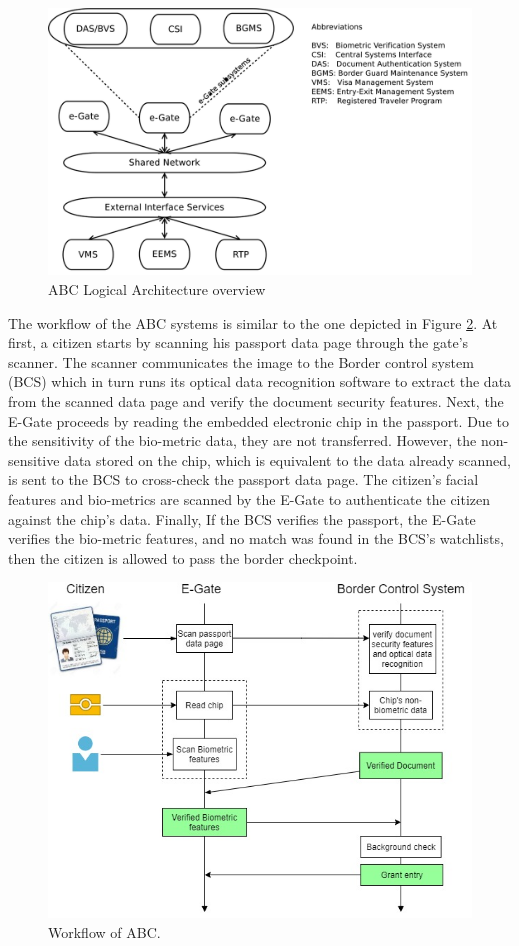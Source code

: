 \begin{figure}[H]
	\centering
	\includegraphics[scale=0.35]{Images/E-Gate-Architecture.png}
	\caption{ABC Logical Architecture overview \cite{labati2016biometric}}
	\label{E-Gate-Architecture}
\end{figure}

\par
The workflow of the ABC systems is similar to the one depicted in Figure \ref{workflow}. At first, a citizen starts by scanning his passport data page through the gate's scanner. The scanner communicates the image to the Border control system (BCS) which in turn runs its optical data recognition software to extract the data from the scanned data page and verify the document security features. Next, the E-Gate proceeds by reading the embedded electronic chip in the passport. Due to the sensitivity of the bio-metric data, they are not transferred. However, the non-sensitive data stored on the chip, which is equivalent to the data already scanned, is sent to the BCS to cross-check the passport data page. The citizen's facial features and bio-metrics are scanned by the E-Gate to authenticate the citizen against the chip's data. Finally, If the BCS verifies the passport, the E-Gate verifies the bio-metric features, and no match was found in the BCS's watchlists, then the citizen is allowed to pass the border checkpoint.

\begin{figure}[H]
	\centering
	\includegraphics[scale=0.3]{Images/ABC.jpeg}
	\caption{Workflow of ABC.}
	\label{workflow}
\end{figure}
